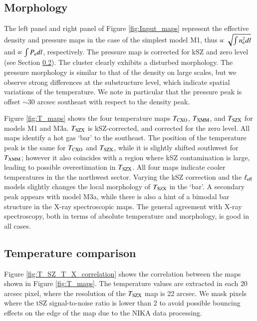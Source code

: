 \documentclass[twocolumn,traditabstract]{aa}
\newcommand{\ccor}[1]{\textcolor{Mypink}{#1}}
\def\xe {n_{\rm e}}
\def\pe {P_{\rm e}}
\def\TSZ {T_{\rm SZX}}
\def \TXC {T_{\rm CXO}}
\def \TXX {T_{\rm XMM}}
\begin{document}
\subsection{Morphology}
\ccor{The left panel and right panel of Figure \ref{fig:Input_maps} represent the effective density and pressure maps in the case of the simplest model M1, thus $\propto \sqrt{\int\xe^2 dl}$ and $\propto \int \pe dl$, respectively. The pressure map is corrected for kSZ and zero level (see Section \ref{sec:compT}). The cluster clearly exhibits a disturbed morphology. The pressure morphology is similar to that of the density on large scales, but we observe strong differences at the substructure level, which indicate spatial variations of the temperature. We note in particular that the pressure peak is offset $\sim 30$ arcsec southeast with respect to the density peak.}

Figure \ref{fig:T_maps} shows the \ccor{four} temperature maps ${T}_{\rm CXO}$, ${T}_{\rm XMM}$, and $\TSZ$ for models M1 and M3a. $\TSZ$ is kSZ-corrected, and corrected for the zero level. All maps identify a hot gas `bar' to the southeast. The position of the temperature peak is the same for $\TXC$ and $\TSZ$, while it is slightly shifted southwest for $\TXX$; however it also coincides with a region where kSZ contamination is large, leading to possible overestimation in $\TSZ$. All four maps indicate cooler temperatures in the the northwest sector. Varying the kSZ correction and the $\ell_{\rm eff}$ models slightly changes the local morphology of $\TSZ$ \ccor{in the `bar'. A secondary peak appears with model M3a, while there is also a hint of a bimodal bar structure in the X-ray spectroscopic maps.} The \ccor{general} agreement with X-ray spectroscopy, \ccor{both in terms of absolute temperature and morphology}, is good in all cases. 

\subsection{Temperature comparison}\label{sec:compT}
Figure \ref{fig:T_SZ_T_X_correlation} shows the correlation between the maps shown in Figure \ref{fig:T_maps}. The temperature values are extracted in each \ccor{20} arcsec pixel, where the resolution of the $\TSZ$ map is 22 arcsec. We mask pixels where the tSZ signal-to-noise ratio is lower than 2 to avoid possible bouncing effects on the edge of the map due to the NIKA data processing.
\end{document}
